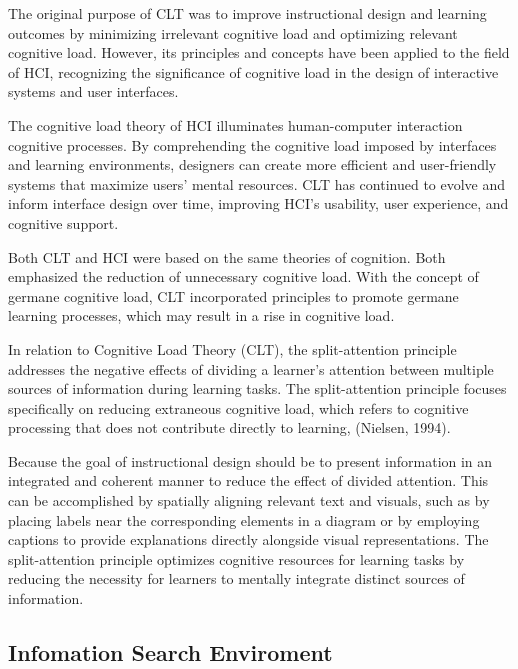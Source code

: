 \documentclass[print]{nuthesis}
\begin{document}
The original purpose of CLT was to improve instructional design and learning outcomes by minimizing irrelevant cognitive load and optimizing relevant cognitive load.
However, its principles and concepts have been applied to the field of HCI, recognizing the significance of cognitive load in the design of interactive systems and user interfaces.

The cognitive load theory of HCI illuminates human-computer interaction cognitive processes.
By comprehending the cognitive load imposed by interfaces and learning environments, designers can create more efficient and user-friendly systems that maximize users' mental resources.
CLT has continued to evolve and inform interface design over time, improving HCI's usability, user experience, and cognitive support.

Both CLT and HCI were based on the same theories of cognition.
Both emphasized the reduction of unnecessary cognitive load.
With the concept of germane cognitive load, CLT incorporated principles to promote germane learning processes, which may result in a rise in cognitive load.

In relation to Cognitive Load Theory (CLT), the split-attention principle addresses the negative effects of dividing a learner's attention between multiple sources of information during learning tasks.
The split-attention principle focuses specifically on reducing extraneous cognitive load, which refers to cognitive processing that does not contribute directly to learning, (Nielsen, 1994).

Because the goal of instructional design should be to present information in an integrated and coherent manner to reduce the effect of divided attention.
This can be accomplished by spatially aligning relevant text and visuals, such as by placing labels near the corresponding elements in a diagram or by employing captions to provide explanations directly alongside visual representations.
The split-attention principle optimizes cognitive resources for learning tasks by reducing the necessity for learners to mentally integrate distinct sources of information.

\hypertarget{infomation-search-enviroment}{%
\subsection{Infomation Search Enviroment}\label{infomation-search-enviroment}}
\end{document}

